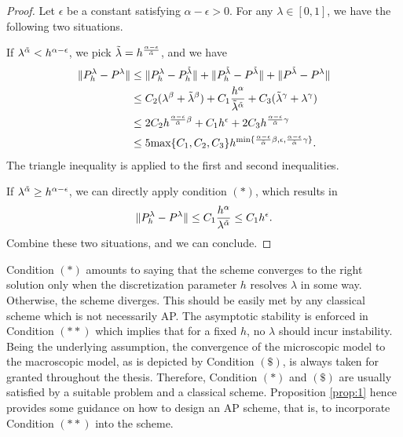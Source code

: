 \documentclass{report}
\begin{document}
\begin{proof}
Let $\epsilon$ be a constant satisfying $\alpha - \epsilon > 0$. For any $\lambda \in [0,1]$, we have the following two situations.

If $\lambda^{\Tilde{\alpha}} < h^{\alpha - \epsilon}$, we pick $\Tilde{\lambda} = h^\frac{\alpha - \epsilon}{\Tilde{\alpha}}$, and we have
\begin{align*}
    \|P^\lambda_h - P^\lambda\| &\leq \|P^\lambda_h - P^{\Tilde{\lambda}}_h\| + \|P^{\Tilde{\lambda}}_h - P^{\Tilde{\lambda}}\| + \|P^{\Tilde{\lambda}} - P^\lambda\| \\
    & \leq C_2(\lambda^\beta + \Tilde{\lambda}^\beta) + C_1\frac{h^\alpha}{{\Tilde{\lambda}}^{\Tilde{\alpha}}} + C_3(\Tilde{\lambda}^\gamma + \lambda^\gamma) \\
    & \leq 2C_2h^{\frac{\alpha - \epsilon}{\Tilde{\alpha}}\beta} + C_1h^\epsilon + 2C_3 h^{\frac{\alpha - \epsilon}{\Tilde{\alpha}}\gamma} \\
    & \leq 5\text{max}\{C_1,C_2,C_3\}h^{\text{min}\{\frac{\alpha - \epsilon}{\Tilde{\alpha}}\beta, \epsilon, \frac{\alpha - \epsilon}{\Tilde{\alpha}}\gamma\}}.
\end{align*}
The triangle inequality is applied to the first and second inequalities. 

If $\lambda^{\Tilde{\alpha}} \geq h^{\alpha - \epsilon}$, we can directly apply condition $(*)$, which results in
\begin{align*}
    \|P^\lambda_h - P^\lambda\| \leq C_1\frac{h^\alpha}{\lambda^{\Tilde{\alpha}}} \leq C_1h^\epsilon.
\end{align*}
Combine these two situations, and we can conclude.
\end{proof}
Condition $(*)$ amounts to saying that the scheme converges to the right solution only when the discretization parameter $h$ resolves $\lambda$ in some way. Otherwise, the scheme diverges. This should be easily met by any classical scheme which is not necessarily AP. The asymptotic stability is enforced in Condition $(**)$ which implies that for a fixed $h$, no $\lambda$ should incur instability. Being the underlying assumption, the convergence of the microscopic model to the macroscopic model, as is depicted by Condition $(\$)$, is always taken for granted throughout the thesis. Therefore, Condition $(*)$ and $(\$)$ are usually satisfied by a suitable problem and a classical scheme. Proposition \ref{prop:1} hence provides some guidance on how to design an AP scheme, that is, to incorporate Condition $(**)$ into the scheme.  
\end{document}
